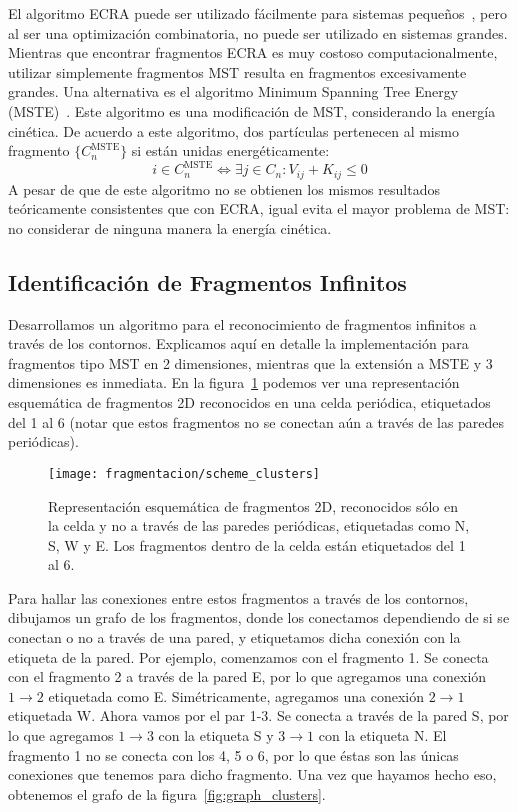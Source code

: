El algoritmo ECRA puede ser utilizado fácilmente para sistemas pequeños~\cite{dorso_fluctuation_1994}, pero al ser una optimización combinatoria, no puede ser utilizado en sistemas grandes.
Mientras que encontrar fragmentos ECRA es muy costoso computacionalmente, utilizar simplemente fragmentos MST resulta en fragmentos excesivamente grandes.
Una alternativa es el algoritmo Minimum Spanning Tree Energy (MSTE)~\cite{dorso_topological_2012}.
Este algoritmo es una modificación de MST, considerando la energía cinética.
De acuerdo a este algoritmo, dos partículas pertenecen al mismo fragmento $\{C^{\text{MSTE}}_n\}$ si están unidas energéticamente:
\begin{equation*}
  i \in C^{\text{MSTE}}_n \Leftrightarrow \exists j \in C_n :
  V_{ij}+ K_{ij} \le 0
\end{equation*}
A pesar de que de este algoritmo no se obtienen los mismos resultados teóricamente consistentes que con ECRA, igual evita el mayor problema de MST: no considerar de ninguna manera la energía cinética.

\subsection{Identificación de Fragmentos Infinitos}
Desarrollamos un algoritmo para el reconocimiento de fragmentos infinitos a través de los contornos.
Explicamos aquí en detalle la implementación para fragmentos tipo MST en 2 dimensiones, mientras que la extensión a MSTE y 3 dimensiones es inmediata.
En la figura~\ref{fig:scheme_clusters} podemos ver una representación esquemática de fragmentos 2D reconocidos en una celda periódica, etiquetados del 1 al 6 (notar que estos fragmentos no se conectan aún a través de las paredes periódicas).

\begin{figure}  \centering
  \texttt{[image: fragmentacion/scheme\_clusters]}
  \caption{Representación esquemática de fragmentos 2D, reconocidos sólo en la celda y no a través de las paredes periódicas, etiquetadas como N, S, W y E.
  Los fragmentos dentro de la celda están etiquetados del 1 al 6.}
\label{fig:scheme_clusters}
\end{figure}

Para hallar las conexiones entre estos fragmentos a través de los contornos, dibujamos un grafo de los fragmentos, donde los conectamos dependiendo de si se conectan o no a través de una pared, y etiquetamos dicha conexión con la etiqueta de la pared.
Por ejemplo, comenzamos con el fragmento 1.
Se conecta con el fragmento 2 a través de la pared E, por lo que agregamos una conexión $1\rightarrow2$ etiquetada como E.
Simétricamente, agregamos una conexión $2\rightarrow1$ etiquetada W.
Ahora vamos por el par 1-3.
Se conecta a través de la pared S, por lo que agregamos $1\rightarrow3$ con la etiqueta S y $3\rightarrow1$ con la etiqueta N.
El fragmento 1 no se conecta con los 4, 5 o 6, por lo que éstas son las únicas conexiones que tenemos para dicho fragmento.
Una vez que hayamos hecho eso, obtenemos el grafo de la figura~\ref{fig:graph_clusters}.


